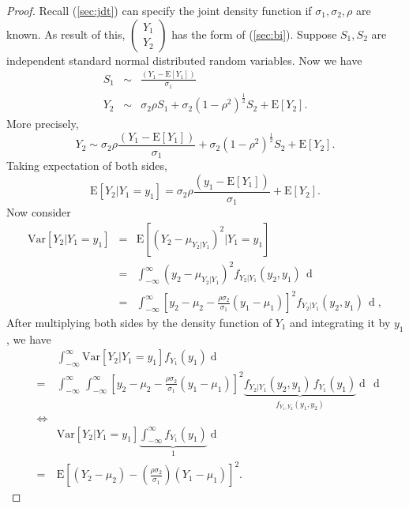 \documentclass[a4paper, twoside, 11pt]{article}
\theoremstyle{definition}
\newcommand{\sqbr}[1]{\left[ {#1} \right]}
\begin{document}
  \begin{proof}
	Recall (\ref{sec:jdt}) can specify the joint density function if $\sigma_1, \sigma_2, \rho$ are known. As result of this,
	$\left(
	  \begin{array}{c}
		Y_1 \\
		Y_2
	  \end{array}
	  \right)$ has the form of (\ref{sec:bi}).
	Suppose $S_1, S_2$ are independent standard normal distributed random variables. Now we have
	\begin{eqnarray*}
	  S_1 &\sim& \frac{(Y_1 - \mathrm{E}[Y_1])}{\sigma_1} \\
	  Y_2 &\sim& \sigma_2\rho S_1 + \sigma_2(1-\rho^2)^{\frac{1}{2}} S_2 + \mathrm{E}[Y_2].
	\end{eqnarray*}
	More precisely,
	$$
	Y_2 \sim \sigma_2\rho \frac{(Y_1 - \mathrm{E}[Y_1])}{\sigma_1}  + \sigma_2(1-\rho^2)^{\frac{1}{2}} S_2 + \mathrm{E}[Y_2].
	$$
	Taking expectation of both sides, 
	\begin{equation*}
	  \mathrm{E}[Y_2|Y_1=y_1] = \sigma_2\rho \frac{(y_1 - \mathrm{E}[Y_1])}{\sigma_1} + \mathrm{E}[Y_2].
	\end{equation*}
	Now consider
	\begin{eqnarray*}
	  \mathrm{Var}[Y_2|Y_1=y_1] &=&  \mathrm{E}[(Y_2 - \mu_{Y_2|Y_1})^2|Y_1=y_1]\\
								&=& \int_{-\infty}^{\infty}(y_2 - \mu_{Y_2|Y_1})^2f_{Y_2|Y_1}(y_2, y_1)\,\mathop{dy_2}\\
								&=& \int_{-\infty}^{\infty}\sqbr{y_2 - \mu_2 - \frac{\rho\sigma_2}{\sigma_1}(y_1-\mu_1)}^2f_{Y_2|Y_1}(y_2, y_1)\,\mathop{dy_2},
	\end{eqnarray*}
   After multiplying both sides by the density function of $Y_1$ and integrating it by $y_1$, we have
  \begin{eqnarray*}
   &\,&\int_{-\infty}^{\infty} \mathrm{Var}[Y_2|Y_1=y_1] f_{Y_1}(y_1) \mathop{dy_1} \\
   &=&\int_{-\infty}^{\infty}\,\int_{-\infty}^{\infty} \sqbr{y_2 - \mu_2 
	  - \frac{\rho\sigma_2}{\sigma_1}(y_1-\mu_1)}^2\underbrace{f_{Y_2|Y_1}(y_2, y_1)\,f_{Y_1}(y_1)}_{f_{Y_1, Y_2}(y_1, y_2)} \mathop{dy_2}\,\mathop{dy_1}\\
	  &\iff&\\
	  &\,&\mathrm{Var}[Y_2|Y_1=y_1] \underbrace{\int_{-\infty}^{\infty}  f_{Y_1}(y_1)}_{1} \mathop{dy_1} \\
	  &=& \mathrm{E}\sqbr{(Y_2 - \mu_2) - (\frac{\rho\sigma_2}{\sigma_1})(Y_1 - \mu_1)}^2.
  \end{eqnarray*}


\end{proof}
\end{document}
